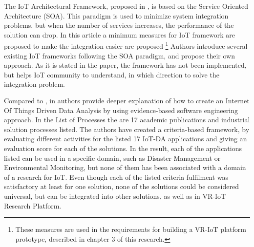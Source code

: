 The IoT Architectural Framework, proposed in \cite{uviase_iot_2018}, is based on the Service Oriented Architecture (SOA). This paradigm is used to minimize system integration problems, but when the number of services increases, the performance of the solution can drop. In this article a minimum measures for IoT framework are proposed to make the integration easier are proposed \footnote{These measures are used in the requirements for building a VR-IoT platform prototype, described in chapter 3 of this research.} Authors introduce several existing IoT frameworks following the SOA paradigm, and propose their own approach. As it is stated in the paper, the framework has not been implemented, but helps IoT community to understand, in which direction to solve the integration problem.

Compared to \cite{k_mohapatra_solution_2016}, in \cite{ahmad_software_2021} authors provide deeper explanation of how to create an Internet Of Things Driven Data Analysis by using evidence-based software engineering approach. In the List of Processes the are 17 academic publications and industrial solution processes listed. The authors have created a criteria-based framework, by evaluating different activities for the listed 17 IoT-DA applications and giving an evaluation score for each of the solutions. In the result, each of the applications listed can be used in a specific domain, such as Disaster Management or Environmental Monitoring, but none of them has been associated with a domain of a research for IoT. Even though each of the listed criteria fulfilment was satisfactory at least for one solution, none of the solutions could be considered universal, but can be integrated into other solutions, as well as in VR-IoT Research Platform.

